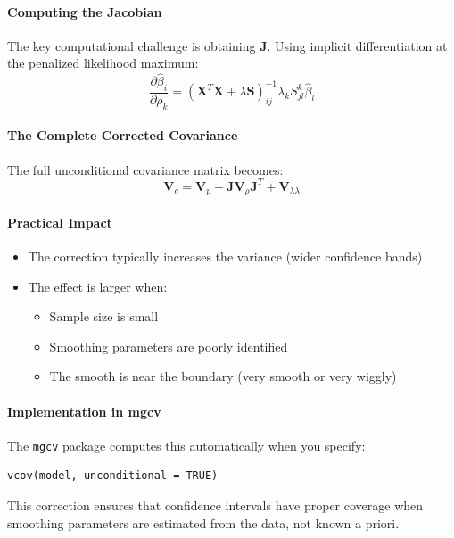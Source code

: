 \documentclass[12pt]{article}
\begin{document}
\paragraph{Computing the Jacobian}
The key computational challenge is obtaining $\mathbf{J}$. Using implicit differentiation at the penalized likelihood maximum:
\begin{equation}
\frac{\partial\hat{\beta}_i}{\partial\rho_k} = (\mathbf{X}^T\mathbf{X} + \lambda\mathbf{S})^{-1}_{ij} \lambda_k S^k_{jl} \hat{\beta}_l
\end{equation}

\paragraph{The Complete Corrected Covariance}
The full unconditional covariance matrix becomes:
\begin{equation}
\boxed{\mathbf{V}_c = \mathbf{V}_p + \mathbf{J}\mathbf{V}_\rho\mathbf{J}^T + \mathbf{V}_{\lambda\lambda}}
\end{equation}

\paragraph{Practical Impact}
\begin{itemize}
    \item The correction typically increases the variance (wider confidence bands)
    \item The effect is larger when:
        \begin{itemize}
            \item Sample size is small
            \item Smoothing parameters are poorly identified
            \item The smooth is near the boundary (very smooth or very wiggly)
        \end{itemize}
\end{itemize}

\paragraph{Implementation in mgcv}
The \texttt{mgcv} package computes this automatically when you specify:
\begin{verbatim}
vcov(model, unconditional = TRUE)
\end{verbatim}

This correction ensures that confidence intervals have proper coverage when smoothing parameters are estimated from the data, not known a priori.
\end{document}
